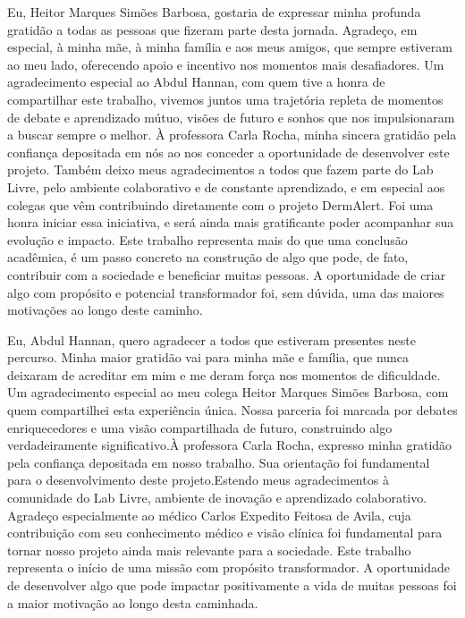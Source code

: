 \begin{agradecimentos}
Eu, Heitor Marques Simões Barbosa, gostaria de expressar minha profunda gratidão a todas as pessoas que fizeram parte desta jornada. Agradeço, em especial, à minha mãe, à minha família e aos meus amigos, que sempre estiveram ao meu lado, oferecendo apoio e incentivo nos momentos mais desafiadores. Um agradecimento especial ao Abdul Hannan, com quem tive a honra de compartilhar este trabalho, vivemos juntos uma trajetória repleta de momentos de debate e aprendizado mútuo, visões de futuro e sonhos que nos impulsionaram a buscar sempre o melhor. À professora Carla Rocha, minha sincera gratidão pela confiança depositada em nós ao nos conceder a oportunidade de desenvolver este projeto. Também deixo meus agradecimentos a todos que fazem parte do Lab Livre, pelo ambiente colaborativo e de constante aprendizado, e em especial aos colegas que vêm contribuindo diretamente com o projeto DermAlert. Foi uma honra iniciar essa iniciativa, e será ainda mais gratificante poder acompanhar sua evolução e impacto. Este trabalho representa mais do que uma conclusão acadêmica, é um passo concreto na construção de algo que pode, de fato, contribuir com a sociedade e beneficiar muitas pessoas. A oportunidade de criar algo com propósito e potencial transformador foi, sem dúvida, uma das maiores motivações ao longo deste caminho.


Eu, Abdul Hannan, quero agradecer a todos que estiveram presentes neste percurso. Minha maior gratidão vai para minha mãe e família, que nunca deixaram de acreditar em mim e me deram força nos momentos de dificuldade. Um agradecimento especial ao meu colega Heitor Marques Simões Barbosa, com quem compartilhei esta experiência única. Nossa parceria foi marcada por debates enriquecedores e uma visão compartilhada de futuro, construindo algo verdadeiramente significativo.À professora Carla Rocha, expresso minha gratidão pela confiança depositada em nosso trabalho. Sua orientação foi fundamental para o desenvolvimento deste projeto.Estendo meus agradecimentos à comunidade do Lab Livre, ambiente de inovação e aprendizado colaborativo. Agradeço especialmente ao médico Carlos Expedito Feitosa de Avila, cuja contribuição com seu conhecimento médico e visão clínica foi fundamental para tornar nosso projeto ainda mais relevante para a sociedade. Este trabalho representa o início de uma missão com propósito transformador. A oportunidade de desenvolver algo que pode impactar positivamente a vida de muitas pessoas foi a maior motivação ao longo desta caminhada.

\end{agradecimentos}
